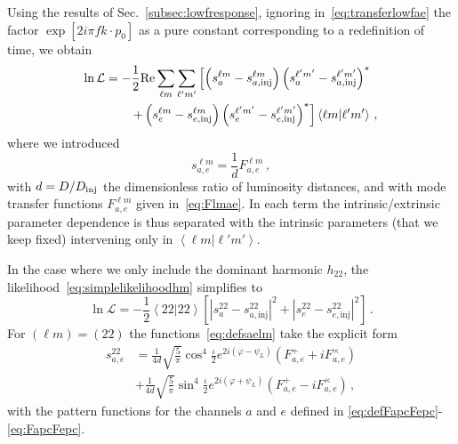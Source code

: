 \documentclass[aps,showpacs,twocolumn,prd,superscriptaddress,nofootinbib]{revtex4-1}
\newcommand{\be}{\begin{equation}}
\newcommand{\ee}{\end{equation}}
\newcommand\calL{{\mathcal{L}}}
\newcommand{\nn}{\nonumber}
\newcommand\psiL{{\psi_{L}}}
\begin{document}
Using the results of Sec.~\ref{subsec:lowfresponse}, ignoring in~\eqref{eq:transferlowfae} the factor $\exp [2 i \pi f k\cdot p_{0}]$ as a pure constant corresponding to a redefinition of time, we obtain
\begin{align}\label{eq:simplelikelihoodhm}
	\ln \calL &= -\frac{1}{2} \mathrm{Re} \sum_{\ell m} \sum_{\ell' m'} \left[ \left( \vphantom{s_{a}^{\ell' m'} } s_{a}^{\ell m} - s_{a, \mathrm{inj}}^{\ell m}\right) \left( s_{a}^{\ell' m'} - s_{a, \mathrm{inj}}^{\ell' m'}\right)^{*} \right. \nn\\
	& \qquad \left. + \left( \vphantom{s_{a}^{\ell' m'} } s_{e}^{\ell m} - s_{e, \mathrm{inj}}^{\ell m}\right) \left( s_{e}^{\ell' m'} - s_{e, \mathrm{inj}}^{\ell' m'}\right)^{*} \right] \left\langle \ell m | \ell' m' \right\rangle \,,
\end{align}
where we introduced
\be\label{eq:defsaelm}
	s_{a,e}^{\ell m} = \frac{1}{d} F_{a,e}^{\ell m} \,,
\ee
with $d = D / D_{\rm inj}$ the dimensionless ratio of luminosity distances, and with mode transfer functions $F_{a,e}^{\ell m}$ given in~\eqref{eq:Flmae}. In each term the intrinsic/extrinsic parameter dependence is thus separated with the intrinsic parameters (that we keep fixed) intervening only in $\left\langle \ell m | \ell' m' \right\rangle$.

In the case where we only include the dominant harmonic $h_{22}$, the likelihood~\eqref{eq:simplelikelihoodhm} simplifies to
\be\label{eq:simplelikelihood22}
	\ln \calL = -\frac{1}{2} \left\langle 22 | 22 \right\rangle  \left[ \left| s_{a}^{22} - s_{a, \mathrm{inj}}^{22} \right|^{2} + \left| s_{e}^{22} - s_{e, \mathrm{inj}}^{22}\right|^{2} \right] \,.
\ee
For $(\ell m)=(22)$ the functions~\eqref{eq:defsaelm} take the explicit form
\begin{align}
	s_{a,e}^{22} &= \frac{1}{4d} \sqrt{\frac{5}{\pi}} \cos^{4}\frac{\iota}{2} e^{2i(\varphi-\psiL)} \left( F_{a,e}^{+} + i F_{a,e}^{\times} \right) \nn \\
	&+ \frac{1}{4d} \sqrt{\frac{5}{\pi}} \sin^{4}\frac{\iota}{2} e^{2i(\varphi+\psiL)} \left( F_{a,e}^{+} - i F_{a,e}^{\times} \right) \,,
\end{align}
with the pattern functions for the channels $a$ and $e$ defined in \eqref{eq:defFapcFepc}-\eqref{eq:FapcFepc}.
\end{document}

